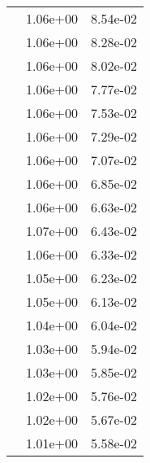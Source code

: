 \begin{table}
\begin{tabular}{c|cc|}
\multicolumn{1}{|c|}{} & \multicolumn{1}{|c|}{  1.06e+00} & \multicolumn{1}{|c|}{  8.54e-02} \\ 
\multicolumn{1}{|c|}{} & \multicolumn{1}{|c|}{  1.06e+00} & \multicolumn{1}{|c|}{  8.28e-02} \\ 
\multicolumn{1}{|c|}{} & \multicolumn{1}{|c|}{  1.06e+00} & \multicolumn{1}{|c|}{  8.02e-02} \\ 
\multicolumn{1}{|c|}{} & \multicolumn{1}{|c|}{  1.06e+00} & \multicolumn{1}{|c|}{  7.77e-02} \\ 
\multicolumn{1}{|c|}{} & \multicolumn{1}{|c|}{  1.06e+00} & \multicolumn{1}{|c|}{  7.53e-02} \\ 
\multicolumn{1}{|c|}{} & \multicolumn{1}{|c|}{  1.06e+00} & \multicolumn{1}{|c|}{  7.29e-02} \\ 
\multicolumn{1}{|c|}{} & \multicolumn{1}{|c|}{  1.06e+00} & \multicolumn{1}{|c|}{  7.07e-02} \\ 
\multicolumn{1}{|c|}{} & \multicolumn{1}{|c|}{  1.06e+00} & \multicolumn{1}{|c|}{  6.85e-02} \\ 
\multicolumn{1}{|c|}{} & \multicolumn{1}{|c|}{  1.06e+00} & \multicolumn{1}{|c|}{  6.63e-02} \\ 
\multicolumn{1}{|c|}{} & \multicolumn{1}{|c|}{  1.07e+00} & \multicolumn{1}{|c|}{  6.43e-02} \\ 
\multicolumn{1}{|c|}{} & \multicolumn{1}{|c|}{  1.06e+00} & \multicolumn{1}{|c|}{  6.33e-02} \\ 
\multicolumn{1}{|c|}{} & \multicolumn{1}{|c|}{  1.05e+00} & \multicolumn{1}{|c|}{  6.23e-02} \\ 
\multicolumn{1}{|c|}{} & \multicolumn{1}{|c|}{  1.05e+00} & \multicolumn{1}{|c|}{  6.13e-02} \\ 
\multicolumn{1}{|c|}{} & \multicolumn{1}{|c|}{  1.04e+00} & \multicolumn{1}{|c|}{  6.04e-02} \\ 
\multicolumn{1}{|c|}{} & \multicolumn{1}{|c|}{  1.03e+00} & \multicolumn{1}{|c|}{  5.94e-02} \\ 
\multicolumn{1}{|c|}{} & \multicolumn{1}{|c|}{  1.03e+00} & \multicolumn{1}{|c|}{  5.85e-02} \\ 
\multicolumn{1}{|c|}{} & \multicolumn{1}{|c|}{  1.02e+00} & \multicolumn{1}{|c|}{  5.76e-02} \\ 
\multicolumn{1}{|c|}{} & \multicolumn{1}{|c|}{  1.02e+00} & \multicolumn{1}{|c|}{  5.67e-02} \\ 
\multicolumn{1}{|c|}{} & \multicolumn{1}{|c|}{  1.01e+00} & \multicolumn{1}{|c|}{  5.58e-02} \\ 

\end{tabular}
\end{table}
